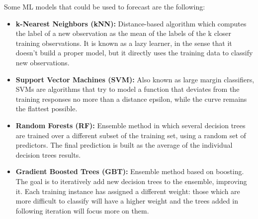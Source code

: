 \noindent Some ML models that could be used to forecast are the following: \cite{berzal2018redes}
\begin{itemize}
    \item \textbf{k-Nearest Neighbors (kNN):} Distance-based algorithm which computes the label of a new observation as the mean of the labels of the k closer training observations. It is known as a lazy learner, in the sense that it doesn't build a proper model, but it directly uses the training data to classify new observations.
    \item \textbf{Support Vector Machines (SVM):} Also known as large margin classifiers, SVMs are algorithms that try to model a function that deviates from the training responses no more than a distance epsilon, while the curve remains the flattest possible.
    \item \textbf{Random Forests (RF):} Ensemble method in which several decision trees are trained over a different subset of the training set, using a random set of predictors. The final prediction is built as the average of the individual decision trees results.
    \item \textbf{Gradient Boosted Trees (GBT):} Ensemble method based on boosting. The goal is to iteratively add new decision trees to the ensemble, improving it. Each training instance has assigned a different weight: those which are more difficult to classify will have a higher weight and the trees added in following iteration will focus more on them.
\end{itemize}

